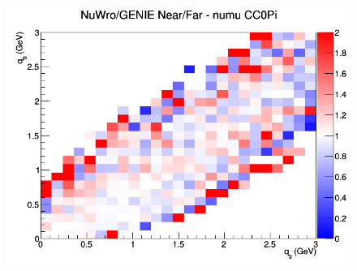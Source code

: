 \begin{figure}[h]
\endminipage
{}
\includegraphics[width=\linewidth]{eff_q0_q3/LAr/ratios/CC0Pi_NuWro_GENIE_numu_NF_q3_q0.png}
\endminipage
\newline
\end{figure}
\clearpage
